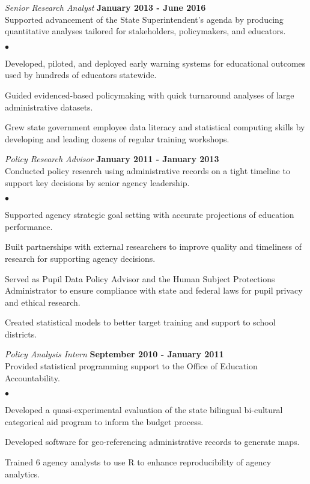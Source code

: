 \documentclass[margin,line]{res}
\newenvironment{list2}{
  \begin{list}{$\bullet$}{%
      \setlength{\itemsep}{0in}
      \setlength{\parsep}{0in} \setlength{\parskip}{0in}
      \setlength{\topsep}{0in} \setlength{\partopsep}{0in} 
      \setlength{\leftmargin}{0.2in}}}{\end{list}}
\begin{document}
\begin{resume}
\vspace{-.3cm}
{\em Senior Research Analyst} \hfill {\bf January 2013 - June 2016}\\
Supported advancement of the State Superintendent's agenda by producing quantitative 
analyses tailored for stakeholders, policymakers, and educators. \\
\vspace{-2mm}
\begin{list2}
\item Developed, piloted, and deployed early warning systems for educational outcomes 
used by hundreds of educators statewide. 
\item Guided evidenced-based policymaking with quick turnaround analyses of large administrative datasets. 
\item Grew state government employee data literacy and statistical computing skills by developing and 
leading dozens of regular training workshops.
\end{list2}

\vspace*{-.3cm}
{\em Policy Research Advisor} \hfill {\bf January 2011 - January 2013} \\
Conducted policy research using administrative records on a tight timeline to 
support key decisions by senior agency leadership. \\

\vspace*{-2mm}

\begin{list2}
\item Supported agency strategic goal setting with accurate projections of education performance.
\item Built partnerships with external researchers to improve quality and 
timeliness of research for supporting agency decisions.
\item Served as Pupil Data Policy Advisor and the Human Subject Protections 
Administrator to ensure compliance with state and federal laws for pupil privacy 
and ethical research.
\item Created statistical models to better target training and support to school districts.
\end{list2}

\vspace{-.3cm}
{\em Policy Analysis Intern} \hfill {\bf September 2010 - January 2011}\\
Provided statistical programming support to the Office of Education Accountability.
\begin{list2}
\item Developed a quasi-experimental evaluation of the state bilingual bi-cultural 
categorical aid program to inform the budget process.
\item Developed software for geo-referencing administrative records to generate 
maps.
\item Trained 6 agency analysts to use R to enhance reproducibility of agency analytics. 
\end{list2}
\vspace{-.1cm}


\end{resume}
\end{document}
